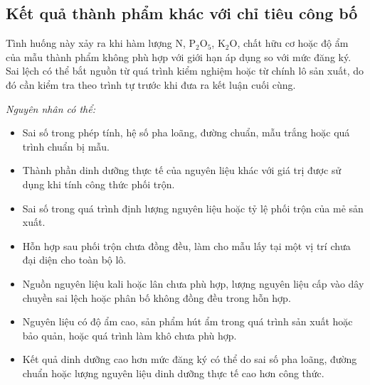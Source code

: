 \subsection{Kết quả thành phẩm khác với chỉ tiêu công bố}
Tình huống này xảy ra khi hàm lượng N, \(\mathrm{P_2O_5}\), \(\mathrm{K_2O}\), chất hữu cơ hoặc độ ẩm của mẫu thành phẩm không phù hợp với giới hạn áp dụng so với mức đăng ký. Sai lệch có thể bắt nguồn từ quá trình kiểm nghiệm hoặc từ chính lô sản xuất, do đó cần kiểm tra theo trình tự trước khi đưa ra kết luận cuối cùng.

\noindent\textit{Nguyên nhân có thể:}
\begin{itemize}
  \item Sai số trong phép tính, hệ số pha loãng, đường chuẩn, mẫu trắng hoặc quá trình chuẩn bị mẫu.
  \item Thành phần dinh dưỡng thực tế của nguyên liệu khác với giá trị được sử dụng khi tính công thức phối trộn.
  \item Sai số trong quá trình định lượng nguyên liệu hoặc tỷ lệ phối trộn của mẻ sản xuất.
  \item Hỗn hợp sau phối trộn chưa đồng đều, làm cho mẫu lấy tại một vị trí chưa đại diện cho toàn bộ lô.
  \item Nguồn nguyên liệu kali hoặc lân chưa phù hợp, lượng nguyên liệu cấp vào dây chuyền sai lệch hoặc phân bố không đồng đều trong hỗn hợp.
  \item Nguyên liệu có độ ẩm cao, sản phẩm hút ẩm trong quá trình sản xuất hoặc bảo quản, hoặc quá trình làm khô chưa phù hợp.
  \item Kết quả dinh dưỡng cao hơn mức đăng ký có thể do sai số pha loãng, đường chuẩn hoặc lượng nguyên liệu dinh dưỡng thực tế cao hơn công thức.
\end{itemize}

